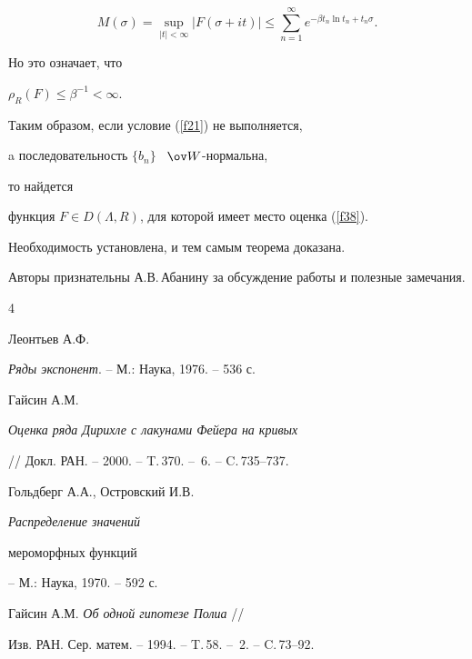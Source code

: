 $$


M(\sigma)=\sup_{|t|<\infty}|F(\sigma+it)|\leq\sum_{n=1}^{\infty} e^{-\beta


t_n \ln t_n+t_n \sigma}.


$$


Но это означает, что \cite{lit1}


$\rho_R (F)\leq\beta^{-1}<\infty$.





Таким образом, если условие (\ref{f21}) не выполняется,


a последовательность $\{b_n\}$ \ $\ov W$-нормальна,


то найдется


функция $F\in D(\Lambda,R)$, для которой имеет место оценка (\ref{f38}).








Необходимость установлена, и тем самым теорема доказана.





Авторы признательны А.В.\,Абанину за обсуждение работы и полезные замечания.





\begin{thebibliography}{4}







Леонтьев А.Ф.


{\em Ряды экспонент}. -- М.: Наука, 1976. -- 536 с.




Гайсин А.М.


{\em Оценка ряда Дирихле с лакунами Фейера на кривых}


// Докл. РАН. -- 2000. -- T.\,370. -- \No\,6. -- C.\,735--737.




Гольдберг А.А., Островский И.В. {\em Распределение значений


мероморфных функций} -- М.: Наука, 1970. -- 592 с.




Гайсин А.М. {\em Об одной гипотезе Полиа} // 


Изв. РАН. Сер. матем. -- 1994. -- T.\,58. -- \No\,2. -- C.\,73--92.





\end{thebibliography}





\vskip 2cm














\label{end}





